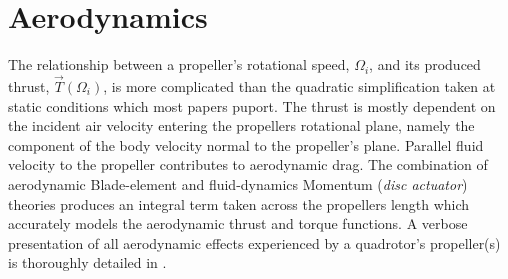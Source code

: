 \section{Aerodynamics}
\label{sec:dynamics.aero}
The relationship between a propeller's rotational speed, $\Omega_i$, and its produced thrust, $\vec{T}(\Omega_i)$, is more complicated than the quadratic simplification taken at static conditions which most papers puport. The thrust is mostly dependent on the incident air velocity entering the propellers rotational plane, namely the component of the body velocity normal to the propeller's plane. Parallel fluid velocity to the propeller contributes to aerodynamic drag. The combination of aerodynamic Blade-element\cite{bem,forwarddescent} and fluid-dynamics Momentum (\emph{disc actuator}) theories produces an integral term taken across the propellers length which accurately models the aerodynamic thrust and torque functions. A verbose presentation of all aerodynamic effects experienced by a quadrotor's propeller(s) is thoroughly detailed in \cite{bladesforquadrotors}.
